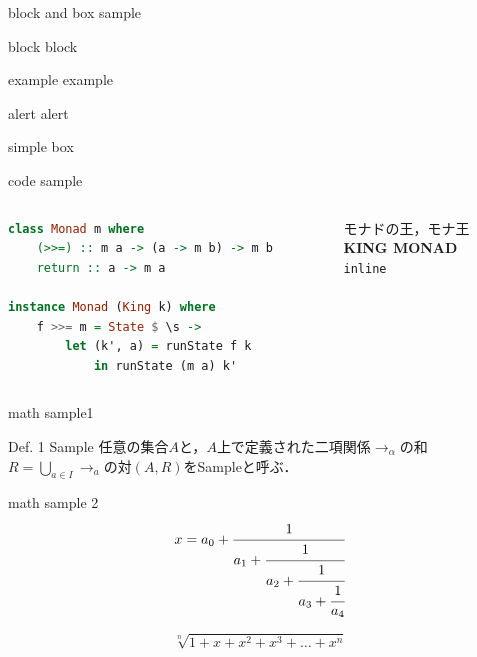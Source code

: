 \documentclass[aspectratio=1610,14pt]{beamer}
\begin{document}
\begin{frame}{block and box sample}
    \begin{block}{block}
        block
    \end{block}
    \begin{exampleblock}{example}
        example
    \end{exampleblock}
    \begin{alertblock}{alert}
        alert
    \end{alertblock}
    \begin{simplebox}
        simple box
    \end{simplebox}
\end{frame}

\begin{frame}[fragile]{code sample}
    \begin{columns}
        \begin{column}{0.5\textwidth}
            \begin{lstlisting}[language=Haskell]
class Monad m where 
    (>>=) :: m a -> (a -> m b) -> m b 
    return :: a -> m a

instance Monad (King k) where
    f >>= m = State $ \s ->
        let (k', a) = runState f k
            in runState (m a) k'
            \end{lstlisting}
        \end{column}
        \begin{column}{0.5\textwidth}
            モナドの王，モナ王 \\
            \textbf{KING MONAD}\\
            \lstinline|inline|
        \end{column}
    \end{columns}
\end{frame}


\begin{frame}{math sample1}
    \begin{block}{Def. 1 Sample}
        任意の集合$A$と，$A$上で定義された二項関係$\to_{\alpha}$の和$R = \bigcup_{a \in I} \to_a $の対$(A, R)$をSampleと呼ぶ．
    \end{block}

\end{frame}

\begin{frame}{math sample 2}
  \begin{equation}
    x = a_0 + \cfrac{1}{a_1 
      + \cfrac{1}{a_2 
        + \cfrac{1}{a_3 + \cfrac{1}{a_4} } } }
  \end{equation}

  \[
  \sqrt[n]{1+x+x^2+x^3+\dots+x^n}
  \]
\end{frame}
\end{document}
